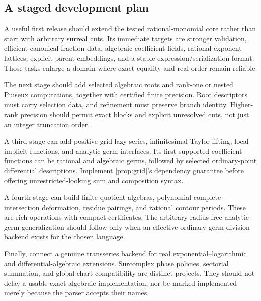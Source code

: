 \documentclass[11pt,letterpaper]{article}
\theoremstyle{definition}\newtheorem{definition}[theorem]{Definition}
\theoremstyle{remark}\newtheorem{remark}[theorem]{Remark}
\numberwithin{equation}{section}\setcounter{tocdepth}{2}
\begin{document}
\subsection{A staged development plan}
A useful first release should extend the tested rational-monomial core rather than start with arbitrary surreal cuts. Its immediate targets are stronger validation, efficient canonical fraction data, algebraic coefficient fields, rational exponent lattices, explicit parent embeddings, and a stable expression/serialization format. Those tasks enlarge a domain where exact equality and real order remain reliable.

The next stage should add selected algebraic roots and rank-one or nested Puiseux computations, together with certified finite precision. Root descriptors must carry selection data, and refinement must preserve branch identity. Higher-rank precision should permit exact blocks and explicit unresolved cuts, not just an integer truncation order.

A third stage can add positive-grid lazy series, infinitesimal Taylor lifting, local implicit functions, and analytic-germ interfaces. Its first supported coefficient functions can be rational and algebraic germs, followed by selected ordinary-point differential descriptions. Implement \cref{prop:grid}'s dependency guarantee before offering unrestricted-looking sum and composition syntax.

A fourth stage can build finite quotient algebras, polynomial complete-intersection deformation, residue pairings, and rational contour periods. These are rich operations with compact certificates. The arbitrary radius-free analytic-germ generalization should follow only when an effective ordinary-germ division backend exists for the chosen language.

Finally, connect a genuine transseries backend for real exponential--logarithmic and differential-algebraic extensions. Surcomplex phase policies, sectorial summation, and global chart compatibility are distinct projects. They should not delay a usable exact algebraic implementation, nor be marked implemented merely because the parser accepts their names.
\end{document}
